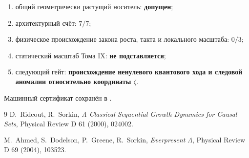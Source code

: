 \begin{protocol}\begin{enumerate}
\item общий геометрически растущий носитель: \textbf{допущен};
\item архитектурный счёт: \textbf{$7/7$};
\item физическое происхождение закона роста, такта и локального масштаба:
\textbf{$0/3$};
\item статический масштаб Тома IX: \textbf{не подставляется};
\item следующий гейт: \textbf{происхождение ненулевого квантового хода и
следовой аномалии относительно координаты $\zeta$}.
\end{enumerate}\end{protocol}

Машинный сертификат сохранён в
.

\begin{thebibliography}{9}
D.~Rideout, R.~Sorkin,
\emph{A Classical Sequential Growth Dynamics for Causal Sets},
Physical Review D 61 (2000), 024002.

M.~Ahmed, S.~Dodelson, P.~Greene, R.~Sorkin,
\emph{Everpresent $\Lambda$},
Physical Review D 69 (2004), 103523.
\end{thebibliography}